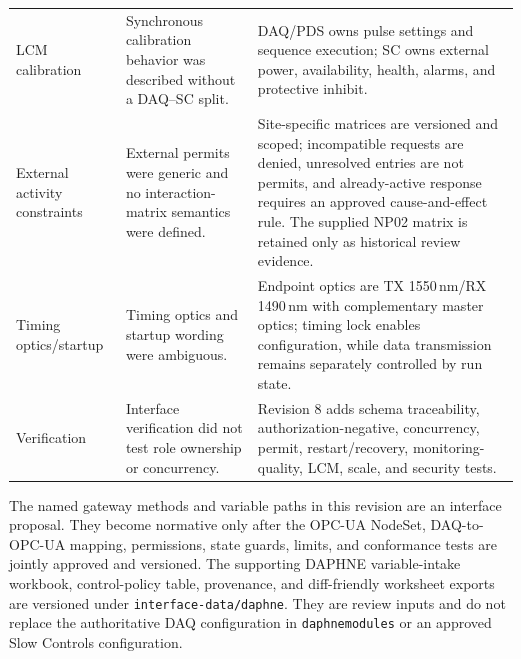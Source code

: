 \begin{longtable}{@{}p{3.0cm}p{5.7cm}p{6.2cm}@{}}
LCM calibration & Synchronous calibration behavior was described without a DAQ--SC split. & DAQ/PDS owns pulse settings and sequence execution; SC owns external power, availability, health, alarms, and protective inhibit. \\
External activity constraints & External permits were generic and no interaction-matrix semantics were defined. & Site-specific matrices are versioned and scoped; incompatible requests are denied, unresolved entries are not permits, and already-active response requires an approved cause-and-effect rule. The supplied NP02 matrix is retained only as historical review evidence. \\
Timing optics/startup & Timing optics and startup wording were ambiguous. & Endpoint optics are TX 1550\,nm/RX 1490\,nm with complementary master optics; timing lock enables configuration, while data transmission remains separately controlled by run state. \\
Verification & Interface verification did not test role ownership or concurrency. & Revision 8 adds schema traceability, authorization-negative, concurrency, permit, restart/recovery, monitoring-quality, LCM, scale, and security tests. \\
\bottomrule
\end{longtable}

The named gateway methods and variable paths in this revision are an interface proposal.
They become normative only after the OPC-UA NodeSet, DAQ-to-OPC-UA mapping, permissions,
state guards, limits, and conformance tests are jointly approved and versioned.
The supporting DAPHNE variable-intake workbook, control-policy table, provenance, and
diff-friendly worksheet exports are versioned under
\texttt{interface-data/daphne}. They are review inputs and do not replace the
authoritative DAQ configuration in \texttt{daphnemodules} or an approved Slow Controls
configuration.
